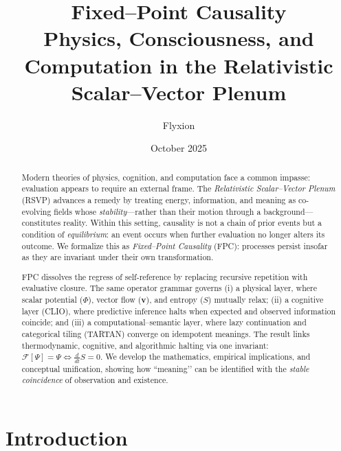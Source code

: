 \documentclass[12pt,a4paper]{article}
\title{\Huge\bfseries Fixed--Point Causality\\[0.35em]
\Large Physics, Consciousness, and Computation in the Relativistic Scalar--Vector Plenum}
\author{Flyxion}
\date{October 2025}
\newcommand{\Ph}{\Phi}                %
\newcommand{\Vv}{\mathbf{v}}          %
\newcommand{\Ss}{S}                   %
\newcommand{\RSVP}{RSVP}              %
\newcommand{\CLIO}{CLIO}              %
\newcommand{\TARTAN}{TARTAN}          %
\newcommand{\ddt}{\tfrac{d}{dt}}      %
\newcommand{\State}{\Psi}             %
\newcommand{\F}{\mathcal{F}}          %
\theoremstyle{plain}
\begin{document}
\maketitle

\begin{abstract}
Modern theories of physics, cognition, and computation face a common impasse: evaluation appears to require an external frame. The \emph{Relativistic Scalar--Vector Plenum} (\RSVP) advances a remedy by treating energy, information, and meaning as co-evolving fields whose \emph{stability}---rather than their motion through a background---constitutes reality. Within this setting, causality is not a chain of prior events but a condition of \emph{equilibrium}: an event occurs when further evaluation no longer alters its outcome. We formalize this as \emph{Fixed--Point Causality} (FPC): processes persist insofar as they are invariant under their own transformation.

FPC dissolves the regress of self-reference by replacing recursive repetition with evaluative closure. The same operator grammar governs (i) a physical layer, where scalar potential (\(\Ph\)), vector flow (\(\Vv\)), and entropy (\(\Ss\)) mutually relax; (ii) a cognitive layer (\CLIO), where predictive inference halts when expected and observed information coincide; and (iii) a computational--semantic layer, where lazy continuation and categorical tiling (\TARTAN) converge on idempotent meanings. The result links thermodynamic, cognitive, and algorithmic halting via one invariant: \(\F[\State]=\State \iff \ddt \Ss=0\). We develop the mathematics, empirical implications, and conceptual unification, showing how “meaning’’ can be identified with the \emph{stable coincidence} of observation and existence.
\end{abstract}

\tableofcontents
\newpage

\section{Introduction}
\label{sec:introduction}
\end{document}
